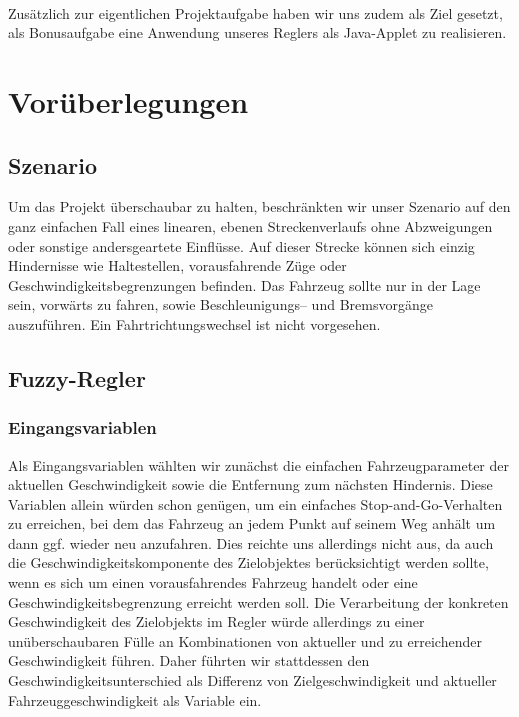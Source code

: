 \documentclass[10pt,a4paper]{article}
\begin{document}
\paragraph{}
Zusätzlich zur eigentlichen Projektaufgabe haben wir uns zudem als Ziel gesetzt, als Bonusaufgabe eine Anwendung unseres Reglers als Java-Applet zu realisieren.

\section{Vorüberlegungen}
\subsection{Szenario}

Um das Projekt überschaubar zu halten, beschränkten wir unser Szenario auf den ganz einfachen Fall eines linearen, ebenen Streckenverlaufs ohne Abzweigungen oder sonstige andersgeartete Einflüsse. Auf dieser Strecke können sich einzig Hindernisse wie Haltestellen, vorausfahrende Züge oder Geschwindigkeitsbegrenzungen befinden. Das Fahrzeug sollte nur in der Lage sein, vorwärts zu fahren, sowie Beschleunigungs-- und Bremsvorgänge auszuführen. Ein Fahrtrichtungswechsel ist nicht vorgesehen.

\subsection{Fuzzy-Regler}

\subsubsection{Eingangsvariablen}
Als Eingangsvariablen wählten wir zunächst die einfachen Fahrzeugparameter der aktuellen Geschwindigkeit sowie die Entfernung zum nächsten Hindernis. Diese Variablen allein würden schon genügen, um ein einfaches Stop-and-Go-Verhalten zu erreichen, bei dem das Fahrzeug an jedem Punkt auf seinem Weg anhält um dann ggf. wieder neu anzufahren.
\newline
Dies reichte uns allerdings nicht aus, da auch die Geschwindigkeitskomponente des Zielobjektes berücksichtigt werden sollte, wenn es sich um einen vorausfahrendes Fahrzeug handelt oder eine Geschwindigkeitsbegrenzung erreicht werden soll.
Die Verarbeitung der konkreten Geschwindigkeit des Zielobjekts im Regler würde allerdings zu einer unüberschaubaren Fülle an Kombinationen von aktueller und zu erreichender Geschwindigkeit führen. Daher führten wir stattdessen den Geschwindigkeitsunterschied als Differenz von Zielgeschwindigkeit und aktueller Fahrzeuggeschwindigkeit als Variable ein.
\end{document}
